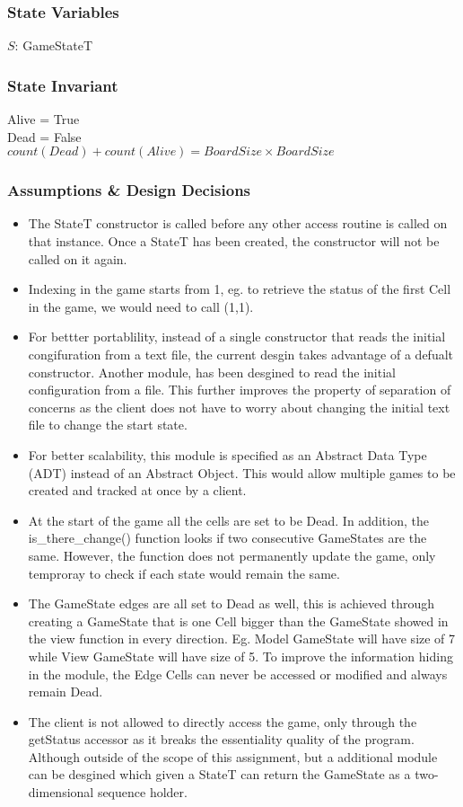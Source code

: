 \documentclass[12pt]{article}
\begin{document}
\subsubsection* {State Variables}

$S$: GameStateT

\subsubsection* {State Invariant}

Alive = True\\
Dead = False\\
$count(Dead) + count(Alive) = BoardSize \times BoardSize$

\subsubsection* {Assumptions \& Design Decisions}

\begin{itemize}
\item The StateT constructor is called before any other access
  routine is called on that instance. Once a StateT has been created, the
  constructor will not be called on it again.
\item Indexing in the game starts from 1, eg. to retrieve the status of the first Cell in the game, we would need to call (1,1). 
\item For bettter portablility, instead of a single constructor that reads the initial congifuration from a text file, the current desgin takes advantage of a defualt constructor. Another module, has been desgined to read the initial configuration from a file. This further improves the property of separation of concerns as the client does not have to worry about changing the initial text file to change the start state. 
\item For better scalability, this module is specified as an Abstract Data Type
  (ADT) instead of an Abstract Object. This would allow multiple games to be
  created and tracked at once by a client.
\item At the start of the game all the cells are set to be Dead. In addition, the is\_there\_change() function looks if two consecutive GameStates are the same. However, the function does not permanently update the game, only temproray to check if each state would remain the same. 
\item The GameState edges are all set to Dead as well, this is achieved through creating a GameState that is one Cell bigger than the GameState showed in the view function in every direction. Eg. Model GameState will have size of 7 while View GameState will have size of 5. To improve the information hiding in the module, the Edge Cells can never be accessed or modified and always remain Dead. 
\item The client is not allowed to directly access the game, only through the getStatus accessor as it breaks the essentiality quality of the program. Although outside of the scope of this assignment, but a additional module can be desgined which given a StateT can return the GameState as a two-dimensional sequence holder. 
\end{itemize}
\end{document}
